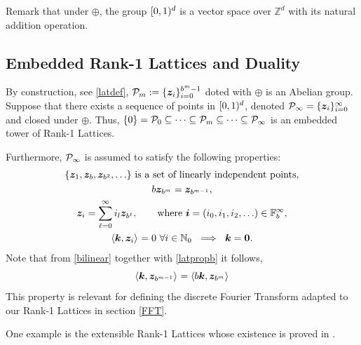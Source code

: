 \documentclass[graybox]{svmult}
\newcommand{\Z}{\mathbb{Z}} %
\newcommand{\N}{\mathbb{N}} %
\newcommand{\F}{\mathbb{F}} %
\newcommand{\bszero}{\boldsymbol{0}} %
\newcommand{\bsz}{\boldsymbol{z}}    %
\begin{document}
Remark that under $\oplus$, the group $[0,1)^d$ is a vector space over $\Z^d$ with its natural addition operation.

\subsection{Embedded Rank-1 Lattices and Duality}
By construction, see \eqref{latdef}, $\cp_m := \{\bsz_i\}_{i=0}^{b^m-1}$ doted with $\oplus$ is an Abelian group. Suppose that there exists a sequence of points in $[0,1)^d$, denoted $\cp_\infty =\{\bsz_i\}_{i=0}^{\infty}$ and closed under $\oplus$. Thus, $\{0\}=\mathcal{P}_0\subseteq\dots\subseteq\mathcal{P}_m\subseteq\dots\subseteq\mathcal{P}_\infty$ is an embedded tower of Rank-1 Lattices.

Furthermore, $\mathcal{P}_\infty$ is assumed to satisfy the following properties:
\begin{subequations} \label{cpinfvector}
\begin{gather}
\{\bsz_{1}, \bsz_{b}, \bsz_{b^2}, \ldots\} \text{ is a set of linearly independent points}, \\
b\bsz_{b^m}=\bsz_{b^{m-1}},\label{latpropb}\\
\bsz_i = \sum_{\ell=0}^{\infty} i_l \bsz_{b^\ell}, \qquad \text{where }\bsi=(i_0, i_1, i_2, \ldots ) \in \F_b^\infty, \label{latpropc}\\
\ip{\bsk}{\bsz_i} =  0 \ \forall i \in \N_0   \ \implies \ \bsk=\bszero. \label{latpropd}
\end{gather}
\end{subequations}
Note that from \eqref{bilinear} together with \eqref{latpropb} it follows,
\begin{equation}\label{assumgenip}
\ip{\bsk}{\bsz_{b^{m-1}}}=\ip{b\bsk}{\bsz_{b^m}}
\end{equation}
This property is relevant for defining the discrete Fourier Transform adapted to our Rank-1 Lattices in section \ref{FFT}.

One example is the extensible Rank-1 Lattices whose existence is proved in \cite{HicNie03a}.
\end{document}
